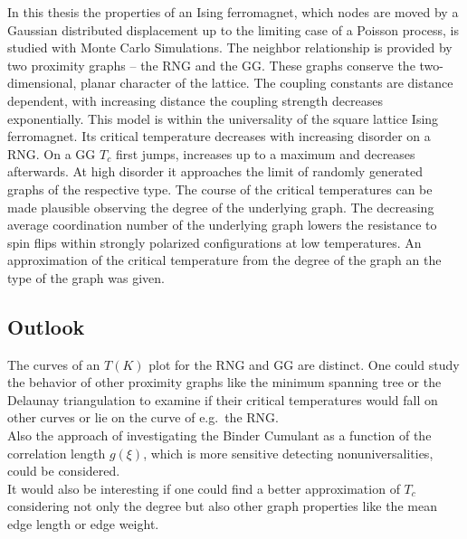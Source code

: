 In this thesis the properties of an Ising ferromagnet, which nodes are
moved by a Gaussian distributed displacement up to the limiting case of
a Poisson process, is studied with Monte Carlo
Simulations. The neighbor relationship is provided by two proximity graphs
-- the RNG and the GG. These graphs conserve the two-dimensional, planar
character of the lattice. The coupling constants
are distance dependent, with increasing distance the coupling strength
decreases exponentially.
This model is within the universality of the square lattice Ising
ferromagnet. Its critical temperature decreases with increasing disorder
on a RNG.
On a GG \(T_c\) first jumps, increases up to a maximum and decreases
afterwards. At high disorder it approaches the limit of randomly generated
graphs of the respective type. The course of the critical temperatures
can be made plausible observing the degree of the underlying graph.
The decreasing average coordination number
of the underlying graph lowers the resistance to spin flips within
strongly polarized configurations at low temperatures.
An approximation of the critical temperature from the degree of the graph
an the type of the graph was given.

\subsection{Outlook}
    The curves of an \(T(K)\) plot for the RNG and GG are distinct. One
    could study the behavior of other proximity graphs like the minimum
    spanning tree or the Delaunay triangulation to examine if their critical
    temperatures would fall on other curves or lie on the curve of e.g.\ the RNG.\\
    Also the approach of investigating the Binder Cumulant as a function
    of the correlation length \(g(\xi)\), which is more
    sensitive detecting nonuniversalities\cite{Hartmann2013}, could be considered.\\
    It would also be interesting if one could find a better approximation
    of \(T_c\) considering not only the degree but also other graph
    properties like the mean edge length or edge weight.
